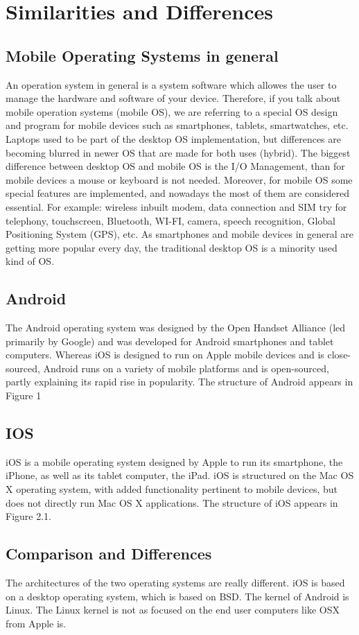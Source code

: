 \documentclass[conference, 11pt]{IEEEtran}
\begin{document}
\section{Similarities and Differences}
\subsection{Mobile Operating Systems in general}
An operation system in general is a system software which allowes the user to manage the hardware and software of your device. Therefore, if you talk about mobile operation systems (mobile OS), we are referring to a special OS design and program for mobile devices such as smartphones, tablets, smartwatches, etc. Laptops used to be part of the desktop OS implementation, but differences are becoming blurred in newer OS that are made for both uses (hybrid). 
The biggest difference between desktop OS and mobile OS is the I/O Management, than for mobile devices a mouse or keyboard is not needed. Moreover, for mobile OS some special features are implemented, and nowadays the most of them are considered essential. For example: wireless inbuilt modem, data connection and SIM try for telephony, touchscreen, Bluetooth, WI-FI, camera, speech recognition, Global Positioning System (GPS), etc.
As smartphones and mobile devices in general are getting more popular every day, the traditional desktop OS is a minority used kind of OS.
\subsection{Android}
The Android operating system was designed by the Open Handset Alliance
(led primarily by Google) and was developed for Android smartphones and
tablet computers. Whereas iOS is designed to run on Apple mobile devices
and is close-sourced, Android runs on a variety of mobile platforms and is
open-sourced, partly explaining its rapid rise in popularity. The structure of
Android appears in Figure 1  \cite{silberschatz}
\subsection{IOS}
iOS is a mobile operating system designed by Apple to run its smartphone, the iPhone, as well as its tablet computer, the iPad. iOS is structured on the Mac OS X operating system, with added functionality pertinent to mobile devices, but does not directly run Mac OS X applications. The structure of iOS appears in Figure 2.1. \cite{silberschatz}
\subsection{Comparison and Differences}
The architectures of the two operating systems are really different. iOS is based on a desktop operating system, which is based on BSD. The kernel of Android is Linux. The Linux kernel is not as focused on the end user computers like OSX from Apple is.
\end{document}
